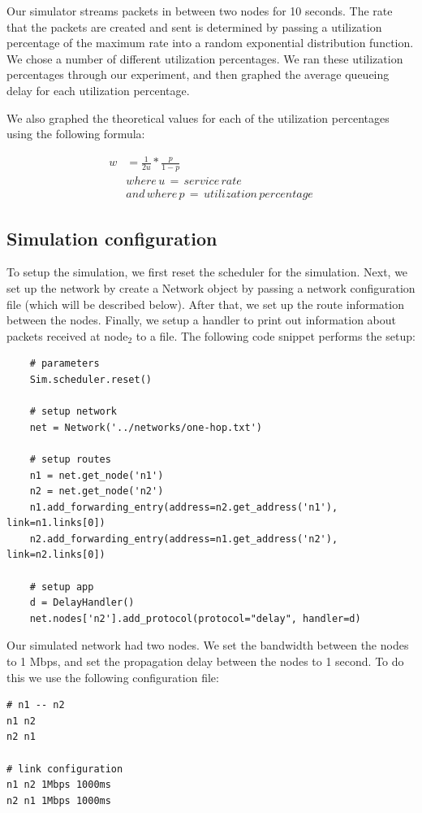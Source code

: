 \documentclass[fleqn,11pt]{article}
\begin{document}
Our simulator streams packets in between two nodes for 10 seconds. The rate that the packets are created and sent is determined by passing a utilization percentage of the maximum rate into a random exponential distribution function. We chose a number of different utilization percentages. We ran these utilization percentages through our experiment, and then graphed the average queueing delay for each utilization percentage. 

We also graphed the theoretical values for each of the utilization percentages using the following formula:

\begin{align*}
w &= \frac{1} {2u} * \frac{p} {1-p} \\
&where\,u\,=\,service\,rate\\
&and\,where\,p\,=\,utilization\,percentage
\end{align*}

\subsection{Simulation configuration}
 To setup the simulation, we first reset the scheduler for the simulation. Next, we set up the network by create a Network object by passing a network configuration file (which will be described below). After that, we set up the route information between the nodes. Finally, we setup a handler to print out information about packets received at node$_2$ to a file.  The following code snippet performs the setup:
\begin{lstlisting}
    # parameters
    Sim.scheduler.reset()

    # setup network
    net = Network('../networks/one-hop.txt')

    # setup routes
    n1 = net.get_node('n1')
    n2 = net.get_node('n2')
    n1.add_forwarding_entry(address=n2.get_address('n1'), link=n1.links[0])
    n2.add_forwarding_entry(address=n1.get_address('n2'), link=n2.links[0])

    # setup app
    d = DelayHandler()
    net.nodes['n2'].add_protocol(protocol="delay", handler=d)

\end{lstlisting}

Our simulated network had two nodes. We set the bandwidth between the nodes to 1 Mbps, and set the propagation delay between the nodes to 1 second. To do this we use the following configuration file:

\begin{lstlisting}
# n1 -- n2
n1 n2
n2 n1

# link configuration
n1 n2 1Mbps 1000ms
n2 n1 1Mbps 1000ms
\end{lstlisting}
\end{document}

